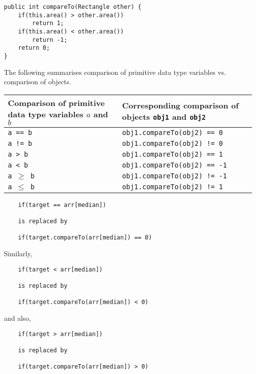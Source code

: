 \begin{questions}
\begin{enumerate}
\begin{lstlisting}
public int compareTo(Rectangle other) {
	if(this.area() > other.area())
		return 1;
	if(this.area() < other.area())
		return -1;
	return 0;
}
\end{lstlisting}

The following summarises comparison of primitive data type variables vs. comparison of objects.

\vskip 0.5cm

\begin{tabular}{p{5cm}|p{5cm}}
  Comparison of primitive data type variables $a$ and $b$ & Corresponding comparison of objects \texttt{obj1} and \texttt{obj2}\\
  \hline
  \texttt{a == b} & \texttt{obj1.compareTo(obj2) == 0}\\
  \hline
  \texttt{a != b} & \texttt{obj1.compareTo(obj2) != 0}\\
  \hline
  \texttt{a > b} & \texttt{obj1.compareTo(obj2) == 1}\\
  \hline
  \texttt{a < b} & \texttt{obj1.compareTo(obj2) == -1}\\
  \hline
  \texttt{a $\geq$ b} & \texttt{obj1.compareTo(obj2) != -1}\\
  \hline
  \texttt{a $\leq$ b} & \texttt{obj1.compareTo(obj2) != 1}
\end{tabular}
\vskip 0.5cm
\end{enumerate}

\begin{solution}
\begin{verbatim}
	if(target == arr[median])
	
	is replaced by 
	
	if(target.compareTo(arr[median]) == 0)
\end{verbatim}	

Similarly, 

\begin{verbatim}
	if(target < arr[median])
	
	is replaced by
	
	if(target.compareTo(arr[median]) < 0)
\end{verbatim}

and also,

\begin{verbatim}
	if(target > arr[median])
	
	is replaced by
	
	if(target.compareTo(arr[median]) > 0)
\end{verbatim}
\end{solution}


\end{questions}
